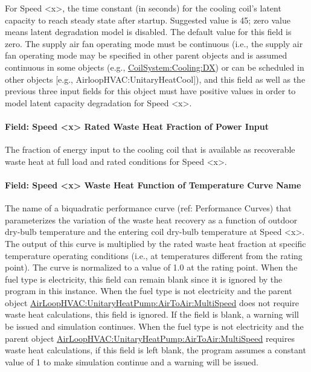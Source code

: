 For Speed \textless{}x\textgreater{}, the time constant (in seconds) for the cooling coil's latent capacity to reach steady state after startup. Suggested value is 45; zero value means latent degradation model is disabled. The default value for this field is zero. The supply air fan operating mode must be continuous (i.e., the supply air fan operating mode may be specified in other parent objects and is assumed continuous in some objects (e.g., \hyperref[coilsystemcoolingdx]{CoilSystem:Cooling:DX}) or can be scheduled in other objects {[}e.g., AirloopHVAC:UnitaryHeatCool{]}), and this field as well as the previous three input fields for this object must have positive values in order to model latent capacity degradation for Speed \textless{}x\textgreater{}.

\paragraph{Field: Speed \textless{}x\textgreater{} Rated Waste Heat Fraction of Power Input}\label{field-speed-x-rated-waste-heat-fraction-of-power-input}

The fraction of energy input to the cooling coil that is available as recoverable waste heat at full load and rated conditions for Speed \textless{}x\textgreater{}.

\paragraph{Field: Speed \textless{}x\textgreater{} Waste Heat Function of Temperature Curve Name}\label{field-speed-x-waste-heat-function-of-temperature-curve-name}

The name of a biquadratic performance curve (ref: Performance Curves) that parameterizes the variation of the waste heat recovery as a function of outdoor dry-bulb temperature and the entering coil dry-bulb temperature at Speed \textless{}x\textgreater{}. The output of this curve is multiplied by the rated waste heat fraction at specific temperature operating conditions (i.e., at temperatures different from the rating point). The curve is normalized to a value of 1.0 at the rating point. When the fuel type is electricity, this field can remain blank since it is ignored by the program in this instance. When the fuel type is not electricity and the parent object \hyperref[airloophvacunitaryheatpumpairtoairmultispeed]{AirLoopHVAC:UnitaryHeatPump:AirToAir:MultiSpeed} does not require waste heat calculations, this field is ignored. If the field is blank, a warning will be issued and simulation continues. When the fuel type is not electricity and the parent object \hyperref[airloophvacunitaryheatpumpairtoairmultispeed]{AirLoopHVAC:UnitaryHeatPump:AirToAir:MultiSpeed} requires waste heat calculations, if this field is left blank, the program assumes a constant value of 1 to make simulation continue and a warning will be issued.

